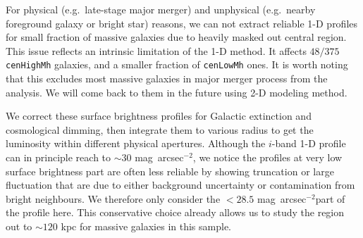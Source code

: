 \documentclass{emulateapj}
\def\sb{mag~arcsec$^{-2}$}
\def\rbcg{\texttt{cenHighMh}}
\def\nbcg{\texttt{cenLowMh}}
\begin{document}
\begin{CJK*}{UTF8}{gbsn}
        
    For physical (e.g.\ late-stage major merger) and unphysical (e.g.\ nearby 
    foreground galaxy or bright star) reasons, we can not extract reliable 1-D 
    profiles for small fraction of massive galaxies due to heavily masked out 
    central region. 
    This issue reflects an intrinsic limitation of the 1-D method. 
    It affects $48/375$ \rbcg{} galaxies, and a smaller fraction of \nbcg{} ones. 
    It is worth noting that this excludes most massive galaxies in major merger 
    process from the analysis. 
    We will come back to them in the future using 2-D modeling method.
    
    We correct these surface brightness profiles for Galactic extinction and 
    cosmological dimming, then integrate them to various radius to get the 
    luminosity within different physical apertures.  
    Although the $i$-band 1-D profile can in principle reach to $\sim 30$ \sb, 
    we notice the profiles at very low surface brightness part are often less 
    reliable by showing truncation or large fluctuation that are due to either 
    background uncertainty or contamination from bright neighbours.
    We therefore only consider the $<28.5$ \sb part of the profile here. 
    This conservative choice already allows us to study the region out to 
    $\sim 120$ kpc for massive galaxies in this sample.  
     
    


\end{CJK*}
\end{document}

